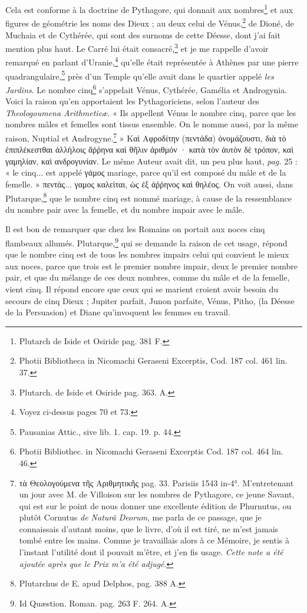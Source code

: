 \documentclass[a4paper, 18pt, oneside]{article}
\begin{document}
Cela est conforme à la doctrine de Pythagore, qui donnait aux nombres\footnote{Plutarch de Iside et Osiride pag. 381 F.} et aux figures de géométrie les noms des Dieux ; au deux celui de Vénus,\footnote{Photii Bibliotheca in Nicomachi Geraseni Excerptis, Cod. 187 col. 461 lin. 37.} de Dioné, de Muchaia et de Cythérée, qui sont des surnoms de cette Déesse, dont j'ai fait mention plus haut. Le Carré lui était consacré,\footnote{Plutarch. de Iside et Osiride pag. 363. A.} et je me rappelle d'avoir remarqué en parlant d'Uranie,\footnote{Voyez ci-dessus pages 70 et 73.} qu'elle était représentée à Athènes par une pierre quadrangulaire,\footnote{Pausanias Attic., sive lib. 1. cap. 19. p. 44.} près d'un Temple qu'elle avait dans le quartier appelé \emph{les Jardins}. Le nombre cinq\footnote{Photii Bibliothec. in Nicomachi Geraseni Excerptis Cod. 187 col. 464 lin. 46.} s'appelait Vénus, Cythérée, Gamélia et Androgynia. Voici la raison qu'en apportaient les Pythagoriciens, selon l'auteur des \emph{Theologoumena Arithmeticæ}. « Ils appellent Vénus le nombre cinq, parce que les nombres mâles et femelles sont tissus ensemble. On le nomme aussi, par la même raison, Nuptial et Androgyne.\footnote{τὰ Θεολογούμενα τῆς Αριθμητικῆς pag. 33. Parisiis 1543 in-4°. M'entretenant un jour avec M. de Villoison sur les nombres de Pythagore, ce jeune Savant, qui est sur le point de nous donner une excellente édition de Phurnutus, ou plutôt Cornutus \emph{de Naturâ Deorum}, me parla de ce passage, que je connaissais d'autant moins, que le livre, d'où il est tiré, ne m'est jamais tombé entre les mains. Comme je travaillais alors à ce Mémoire, je sentis à l'instant l'utilité dont il pouvait m'être, et j'en fis usage. \emph{Cette note a été ajoutée après que le Prix m'a été adjugé}.} » Καὶ Αφροδίτην (πεντάδα) ὀνομάζουστι, διὰ τὸ ἐπιπλέκεστθαι ἀλλήλοις ἄῤῥηνα καὶ θῆλιν ἀριθμόν · κατὰ τὸν ἀυτὸν δὲ τρόπον, καὶ γαμηλίαν, καὶ ανδρογυνίαν. Le même Auteur avait dit, un peu plus haut, \emph{pag.} 25 : « le cinq... est appelé γάμος mariage, parce qu'il est composé du mâle et de la femelle. » πεντὰς... γαμος καλείται, ὡς ἐξ ἀῤῥηνος καὶ θηλέος. On voit aussi, dans Plutarque,\footnote{Plutarchus de E. apud Delphos, pag. 388 A.} que le nombre cinq est nommé mariage, à cause de la ressemblance du nombre pair avec la femelle, et du nombre impair avec le mâle.

Il est bon de remarquer que chez les Romains on portait aux noces cinq flambeaux allumés. Plutarque,\footnote{Id Quæstion. Roman. pag. 263 F. 264. A.} qui se demande la raison de cet usage, répond que le nombre cinq est de tous les nombres impairs celui qui convient le mieux aux noces, parce que trois est le premier nombre impair, deux le premier nombre pair, et que du mélange de ces deux nombres, comme du mâle et de la femelle, vient cinq. Il répond encore que ceux qui se marient croient avoir besoin du secours de cinq Dieux ; Jupiter parfait, Junon parfaite, Vénus, Pitho, (la Déesse de la Persuasion) et Diane qu'invoquent les femmes en travail.
\end{document}
